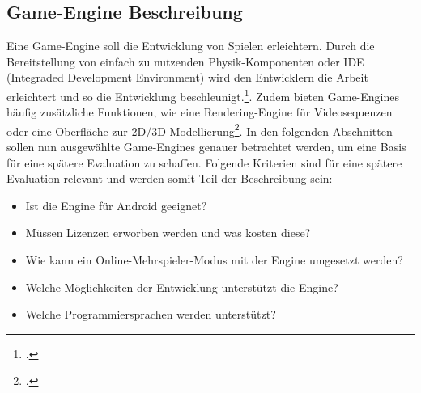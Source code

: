 \subsection{Game-Engine Beschreibung}
	Eine Game-Engine soll die Entwicklung von Spielen erleichtern. Durch die Bereitstellung von einfach zu nutzenden Physik-Komponenten oder IDE (Integraded Development Environment) wird den Entwicklern die Arbeit erleichtert und so die Entwicklung beschleunigt.\footcite[S.11]{gregory2014game}. Zudem bieten Game-Engines häufig zusätzliche Funktionen, wie eine Rendering-Engine für Videosequenzen oder eine Oberfläche zur 2D/3D Modellierung\footcite[S. 36ff.]{gregory2014game}.
	In den folgenden Abschnitten sollen nun ausgewählte Game-Engines genauer betrachtet werden, um eine Basis für eine spätere Evaluation zu schaffen. Folgende Kriterien sind für eine spätere Evaluation relevant und werden somit Teil der Beschreibung sein:
	\begin{itemize}
		\item{Ist die Engine für Android geeignet?}
		\item{Müssen Lizenzen erworben werden und was kosten diese?}
		\item{Wie kann ein Online-Mehrspieler-Modus mit der Engine umgesetzt werden?}
		\item{Welche Möglichkeiten der Entwicklung unterstützt die Engine?}
		\item{Welche Programmiersprachen werden unterstützt?}
	\end{itemize}

